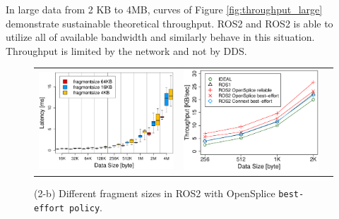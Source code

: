 \documentclass{sig-alternate-05-2015}
\begin{document}
In large data from 2 KB to 4MB, curves of Figure \ref{fig:throughput_large} demonstrate sustainable theoretical throughput.
ROS2 and ROS2 is able to utilize all of available bandwidth and similarly behave in this situation.
Throughput is limited by the network and not by DDS.

\begin{figure}[t]
  \begin{tabular}{ccc}
    \begin{minipage}[t]{0.31\textwidth}
      \includegraphics[width=1.0\linewidth]{../figure/comparison_ospl_frag_BoxPlot.eps}
      \caption{(2-b) Different fragment sizes in ROS2 with OpenSplice \texttt{best-effort policy}.}
      \label{fig:frag_boxplot}
    \end{minipage}
    &
    \begin{minipage}[t]{0.31\textwidth}
      \includegraphics[width=1.0\linewidth]{../figure/throughput_remote_small-data.eps}

\end{minipage}
\end{tabular}
\end{figure}
\end{document}
